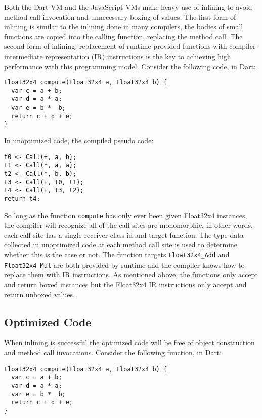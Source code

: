 \documentclass[preprint]{sigplanconf}
\begin{document}
Both the Dart VM and the JavaScript VMs make heavy use of inlining to
avoid method call invocation and unnecessary boxing of values. The
first form of inlining is similar to the inlining done in many
compilers, the bodies of small functions are copied into the calling
function, replacing the method call. The second form of inlining,
replacement of runtime provided functions with compiler intermediate
representation (IR) instructions is the key to achieving high
performance with this programming model. Consider the following code,
in Dart:

\begin{small}
\begin{lstlisting}
Float32x4 compute(Float32x4 a, Float32x4 b) {
  var c = a + b;
  var d = a * a;
  var e = b *  b;
  return c + d + e;
}
\end{lstlisting}
\end{small}

In unoptimized code, the compiled pseudo code:

\begin{small}
\begin{lstlisting}
t0 <- Call(+, a, b);
t1 <- Call(*, a, a);
t2 <- Call(*, b, b);
t3 <- Call(+, t0, t1);
t4 <- Call(+, t3, t2);
return t4;
\end{lstlisting}
\end{small}

So long as the function \verb!compute! has only ever been given Float32x4
instances, the compiler will recognize all of the call sites are monomorphic, in
other words, each call site has a single receiver class id and target function.
The type data collected in unoptimized code at each method call site is used to
determine whether this is the case or not. The function targets
\verb!Float32x4_Add! and \verb!Float32x4_Mul! are both provided by runtime and
the compiler knows how to replace them with IR instructions. As mentioned above,
the functions only accept and return boxed instances but the Float32x4 IR
instructions only accept and return unboxed values.

\subsection{Optimized Code}

When inlining is successful the optimized code will be free of object
construction and method call invocations. Consider the following function, in
Dart:

\begin{small}
\begin{lstlisting}
Float32x4 compute(Float32x4 a, Float32x4 b) {
  var c = a + b;
  var d = a * a;
  var e = b *  b;
  return c + d + e;
}
\end{lstlisting}
\end{small}
\end{document}
